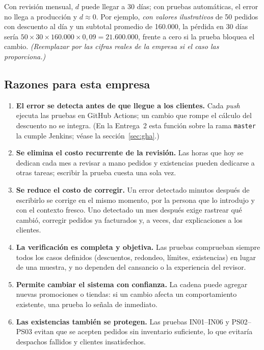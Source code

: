 \documentclass[11pt,a4paper]{article}
\begin{document}
Con revisión mensual, $d$ puede llegar a 30 días; con pruebas automáticas, el error no llega a
producción y $d \approx 0$. Por ejemplo, \emph{con valores ilustrativos} de 50 pedidos con descuento
al día y un subtotal promedio de 160.000, la pérdida en 30 días sería
$50 \times 30 \times 160.000 \times 0{,}09 = 21.600.000$, frente a cero si la prueba bloquea el cambio.
\textit{(Reemplazar por las cifras reales de la empresa si el caso las proporciona.)}

\subsection{Razones para esta empresa}

\begin{enumerate}
  \item \textbf{El error se detecta antes de que llegue a los clientes.} Cada \emph{push} ejecuta las
        pruebas en GitHub Actions; un cambio que rompe el cálculo del descuento no se integra.
        (En la Entrega~2 esta función sobre la rama \texttt{master} la cumple Jenkins; véase la
        sección~\ref{sec:gha}.)
  \item \textbf{Se elimina el costo recurrente de la revisión.} Las horas que hoy se dedican cada mes
        a revisar a mano pedidos y existencias pueden dedicarse a otras tareas; escribir la prueba
        cuesta una sola vez.
  \item \textbf{Se reduce el costo de corregir.} Un error detectado minutos después de escribirlo se
        corrige en el mismo momento, por la persona que lo introdujo y con el contexto fresco. Uno
        detectado un mes después exige rastrear qué cambió, corregir pedidos ya facturados y, a veces,
        dar explicaciones a los clientes.
  \item \textbf{La verificación es completa y objetiva.} Las pruebas comprueban siempre todos los
        casos definidos (descuentos, redondeo, límites, existencias) en lugar de una muestra, y no
        dependen del cansancio o la experiencia del revisor.
  \item \textbf{Permite cambiar el sistema con confianza.} La cadena puede agregar nuevas promociones
        o tiendas: si un cambio afecta un comportamiento existente, una prueba lo señala de inmediato.
  \item \textbf{Las existencias también se protegen.} Las pruebas IN01--IN06 y PS02--PS03 evitan que
        se acepten pedidos sin inventario suficiente, lo que evitaría despachos fallidos y clientes
        insatisfechos.
\end{enumerate}
\end{document}
